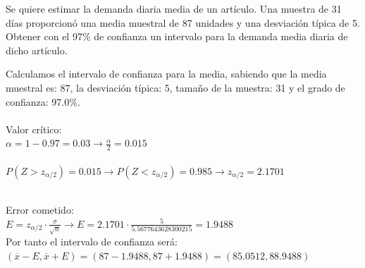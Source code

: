 \documentclass[spanish, 11pt]{exam}
\begin{document}
        \begin{questions}
        \question Se quiere estimar la demanda diaria media de un artículo.
Una muestra de 31 días proporcionó una media muestral de 87 unidades y una desviación típica
 de 5. Obtener con el 97\% de confianza un intervalo para la demanda media diaria de dicho
artículo. \begin{solution}   Calculamos el intervalo de confianza para la media, sabiendo que la media muestral es: 87, la desviación típica: 5, tamaño de la muestra: 31 y el grado de confianza: 97.0\%. \\ \\ Valor crítico: \\ $\alpha=1-0.97=0.03\to \frac{\alpha}{2}=0.015$ \\ \\ $P(Z>z_{\alpha/2})=0.015\to P(Z<z_{\alpha/2})=0.985 \to z_{\alpha/2} =2.1701$ \\ 
     \\
    Error cometido: \\ $E=z_{\alpha/2}\cdot \frac{\sigma}{\sqrt{n}} \to E=2.1701\cdot \frac{5}{5.5677643628300215}=1.9488$ \\ Por tanto el intervalo de confianza será: \\$\left(\overline{x} - E , \overline{x} + E \right)=\left(87 - 1.9488 , 87 + 1.9488 \right)=\left(85.0512, 88.9488 \right)$ \\  \\ 
\end{solution}
\end{questions}
\end{document}
